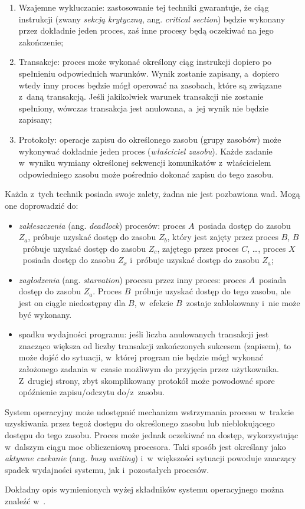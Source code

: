 \documentclass[12pt]{mwart}
\begin{document}
  \begin{enumerate}
    \item Wzajemne wykluczanie: zastosowanie tej techniki gwarantuje, że ciąg instrukcji (zwany \emph{sekcją krytyczną}, ang. \emph{critical section})
      będzie wykonany przez dokładnie jeden proces, zaś inne procesy będą oczekiwać na jego zakończenie;
    \item Transakcje: proces może wykonać określony ciąg instrukcji dopiero po spełnieniu odpowiednich warunków. Wynik zostanie zapisany, a~dopiero wtedy inny proces będzie mógł operować na
      zasobach, które są związane z~daną transakcją. Jeśli jakikolwiek warunek transakcji nie zostanie spełniony, wówczas transakcja jest anulowana, a~jej wynik nie będzie zapisany;
    \item Protokoły: operacje zapisu do określonego zasobu (grupy zasobów) może wykonywać dokładnie jeden proces (\emph{właściciel zasobu}). 
      Każde zadanie w~wyniku wymiany określonej sekwencji komunikatów z~właścicielem odpowiedniego zasobu może pośrednio dokonać zapisu do tego zasobu.
  \end{enumerate}
  Każda z~tych technik posiada swoje zalety, żadna nie jest pozbawiona wad. Mogą one doprowadzić do:
  \begin{itemize}
    \item \emph{zakleszczenia} (ang. \emph{deadlock}) procesów: proces $A$~posiada dostęp do zasobu $Z_a$, próbuje uzyskać dostęp do zasobu $Z_b$, który jest zajęty przez proces $B$,
      $B$~próbuje uzyskać dostęp do zasobu $Z_c$, zajętego przez proces $C$, \ldots, proces $X$~posiada dostęp do zasobu $Z_x$ i~próbuje uzyskać dostęp do zasobu $Z_a$;
    \item \emph{zagłodzenia} (ang. \emph{starvation}) procesu przez inny proces: proces $A$~posiada dostęp do zasobu $Z_a$. Proces $B$~próbuje uzyskać dostęp do tego zasobu, ale jest on
      ciągle niedostępny dla $B$, w~efekcie $B$~zostaje zablokowany i~nie może być wykonany.
    \item spadku wydajności programu: jeśli liczba anulowanych transakcji jest znacząco większa od liczby transakcji zakończonych sukcesem (zapisem), to może dojść do sytuacji, w~której
      program nie będzie mógł wykonać założonego zadania w~czasie możliwym do przyjęcia przez użytkownika. Z~drugiej strony, zbyt skomplikowany protokół może powodować spore opóźnienie
      zapisu/odczytu do/z~zasobu.
  \end{itemize}
\par
%
\indent
  System operacyjny może udostępnić mechanizm wstrzymania procesu w~trakcie uzyskiwania przez tegoż dostępu do określonego zasobu lub nieblokującego dostępu do tego zasobu.
  Proces może jednak oczekiwać na dostęp, wykorzystując w~dalszym ciągu moc obliczeniową procesora. Taki sposób jest określany jako \emph{aktywne czekanie} (ang. \emph{busy waiting})
  i~w~większości sytuacji powoduje znaczący spadek wydajności systemu, jak i~pozostałych procesów.
\par
%
\indent
  Dokładny opis wymienionych wyżej składników systemu operacyjnego można znaleźć w~\cite{silberschatz}.
\par
%
\newpage
\end{document}
